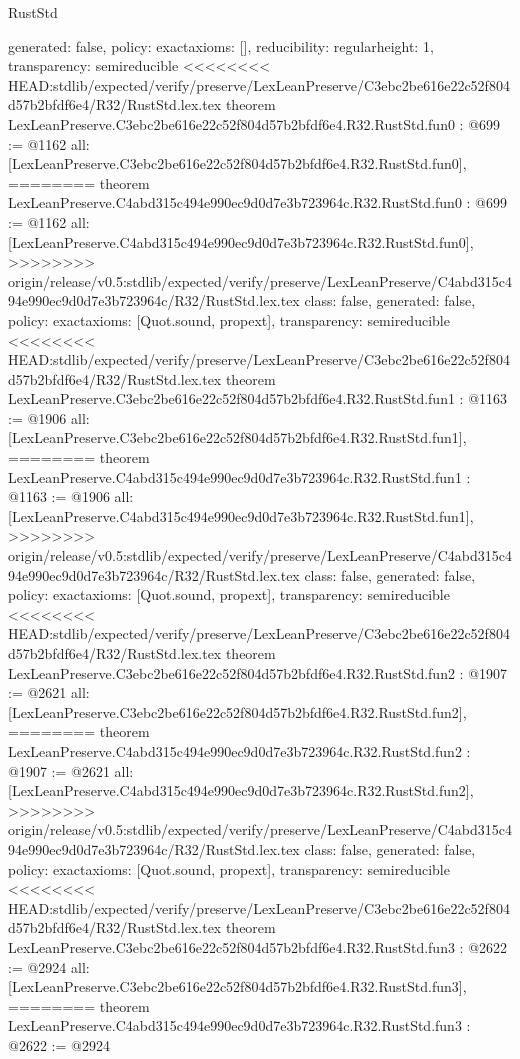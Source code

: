 \begin{lexlean}{RustStd}
\begin{coremodule}
{\begin{coremodule}
{{{  generated: false,
  policy: exact{axioms: []},
  reducibility: regular{height: 1},
  transparency: semireducible
}
<<<<<<<< HEAD:stdlib/expected/verify/preserve/LexLeanPreserve/C3ebc2be616e22c52f804d57b2bfdf6e4/R32/RustStd.lex.tex
theorem LexLeanPreserve.C3ebc2be616e22c52f804d57b2bfdf6e4.R32.RustStd.fun0 : @699 := @1162 {
  all: [LexLeanPreserve.C3ebc2be616e22c52f804d57b2bfdf6e4.R32.RustStd.fun0],
========
theorem LexLeanPreserve.C4abd315c494e990ec9d0d7e3b723964c.R32.RustStd.fun0 : @699 := @1162 {
  all: [LexLeanPreserve.C4abd315c494e990ec9d0d7e3b723964c.R32.RustStd.fun0],
>>>>>>>> origin/release/v0.5:stdlib/expected/verify/preserve/LexLeanPreserve/C4abd315c494e990ec9d0d7e3b723964c/R32/RustStd.lex.tex
  class: false,
  generated: false,
  policy: exact{axioms: [Quot.sound, propext]},
  transparency: semireducible
}
<<<<<<<< HEAD:stdlib/expected/verify/preserve/LexLeanPreserve/C3ebc2be616e22c52f804d57b2bfdf6e4/R32/RustStd.lex.tex
theorem LexLeanPreserve.C3ebc2be616e22c52f804d57b2bfdf6e4.R32.RustStd.fun1 : @1163 := @1906 {
  all: [LexLeanPreserve.C3ebc2be616e22c52f804d57b2bfdf6e4.R32.RustStd.fun1],
========
theorem LexLeanPreserve.C4abd315c494e990ec9d0d7e3b723964c.R32.RustStd.fun1 : @1163 := @1906 {
  all: [LexLeanPreserve.C4abd315c494e990ec9d0d7e3b723964c.R32.RustStd.fun1],
>>>>>>>> origin/release/v0.5:stdlib/expected/verify/preserve/LexLeanPreserve/C4abd315c494e990ec9d0d7e3b723964c/R32/RustStd.lex.tex
  class: false,
  generated: false,
  policy: exact{axioms: [Quot.sound, propext]},
  transparency: semireducible
}
<<<<<<<< HEAD:stdlib/expected/verify/preserve/LexLeanPreserve/C3ebc2be616e22c52f804d57b2bfdf6e4/R32/RustStd.lex.tex
theorem LexLeanPreserve.C3ebc2be616e22c52f804d57b2bfdf6e4.R32.RustStd.fun2 : @1907 := @2621 {
  all: [LexLeanPreserve.C3ebc2be616e22c52f804d57b2bfdf6e4.R32.RustStd.fun2],
========
theorem LexLeanPreserve.C4abd315c494e990ec9d0d7e3b723964c.R32.RustStd.fun2 : @1907 := @2621 {
  all: [LexLeanPreserve.C4abd315c494e990ec9d0d7e3b723964c.R32.RustStd.fun2],
>>>>>>>> origin/release/v0.5:stdlib/expected/verify/preserve/LexLeanPreserve/C4abd315c494e990ec9d0d7e3b723964c/R32/RustStd.lex.tex
  class: false,
  generated: false,
  policy: exact{axioms: [Quot.sound, propext]},
  transparency: semireducible
}
<<<<<<<< HEAD:stdlib/expected/verify/preserve/LexLeanPreserve/C3ebc2be616e22c52f804d57b2bfdf6e4/R32/RustStd.lex.tex
theorem LexLeanPreserve.C3ebc2be616e22c52f804d57b2bfdf6e4.R32.RustStd.fun3 : @2622 := @2924 {
  all: [LexLeanPreserve.C3ebc2be616e22c52f804d57b2bfdf6e4.R32.RustStd.fun3],
========
theorem LexLeanPreserve.C4abd315c494e990ec9d0d7e3b723964c.R32.RustStd.fun3 : @2622 := @2924 {
}}}}}}}
\end{coremodule}}
\end{coremodule}
\end{lexlean}
